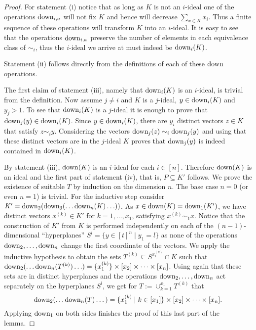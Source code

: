 \begin{proof}
For statement (i) notice that as long as $K$ is not 
an $i$-ideal one of the operations $\operatorname{down}_{i,a}$ 
will not fix $K$ and hence will decrease $\sum_{x\in K}x_i$. 
Thus a finite sequence of these operations will transform $K$ 
into an $i$-ideal. 
It is easy to see that the operations $\operatorname{down}_{i,a}$ preserve the
number of elements in each equivalence class of $\sim_i$, 
thus the $i$-ideal we arrive at must indeed be $\operatorname{down}_i(K)$.

Statement (ii) follows directly from the definitions of each of
these $\operatorname{down}$ operations.
 
The first claim of statement (iii), namely that $\operatorname{down}_i(K)$ is
an $i$-ideal, is trivial from the definition. Now assume $j\ne
i$ and $K$ is a $j$-ideal, $y\in\operatorname{down}_i(K)$ and $y_j>1$. To see
that $\operatorname{down}_i(K)$ is a $j$-ideal it is enough to prove that
$\operatorname{down}_j(y)\in\operatorname{down}_i(K)$. Since $y\in\operatorname{down}_i(K)$, there are
$y_i$ distinct vectors $z\in K$ that satisfy $z\sim_i y$.
Considering the vectors $\operatorname{down}_j(z)\sim_i\operatorname{down}_j(y)$ and using
that these distinct vectors are in the $j$-ideal $K$ proves that
$\operatorname{down}_j(y)$ is indeed contained in $\operatorname{down}_i(K)$.

By statement (iii), $\operatorname{down}(K)$ is an $i$-ideal for each $i\in
[n]$. Therefore $\operatorname{down}(K)$ is an ideal and the first part of
statement (iv), that is, $P\subseteq K'$ follows. We prove the
existence of suitable $T$ by induction on the dimension $n$. The
base case $n=0$ (or even $n=1$) is trivial. For the inductive
step consider $K'=\operatorname{down}_2(\operatorname{down}_3(\ldots\operatorname{down}_n(K)\ldots))$. As
$x\in\operatorname{down}(K)=\operatorname{down}_1(K')$, we have distinct vectors $x^{(k)}\in
K'$ for $k=1,\ldots, x_1$, satisfying $x^{(k)}\sim_1x$. Notice
that the construction of $K'$ from $K$ is performed
independently on each of the $(n-1)$-dimensional ``hyperplanes''
$S^l=\{y\in[t]^n\mid y_1=l\}$ as none of the operations
$\operatorname{down}_2,\ldots,\operatorname{down}_n$ change the first coordinate of the
vectors. We apply the inductive hypothesis to obtain the sets
$T^{(k)}\subseteq S^{x^{(k)}_1}\cap K$ such that
$\operatorname{down}_2(\ldots\operatorname{down}_n(T^{(k)})\ldots)=\{x^{(k)}_1\}
\times[x_2]\times\cdots\times[x_n]$. Using again that these sets
are in distinct hyperplanes and the operations
$\operatorname{down}_2,\ldots,\operatorname{down}_n$ act separately on the hyperplanes
$S^l$, we get for $T:=\cup_{k=1}^{x_1}T^{(k)}$ that
$$\operatorname{down}_2(\dots\operatorname{down}_n(T)\dots)=\{x^{(k)}_1\mid
k\in[x_1]\}\times[x_2]\times\cdots\times[x_n].$$ Applying
$\operatorname{down}_1$ on both sides finishes the proof of this last part of
the lemma.
\end{proof}

